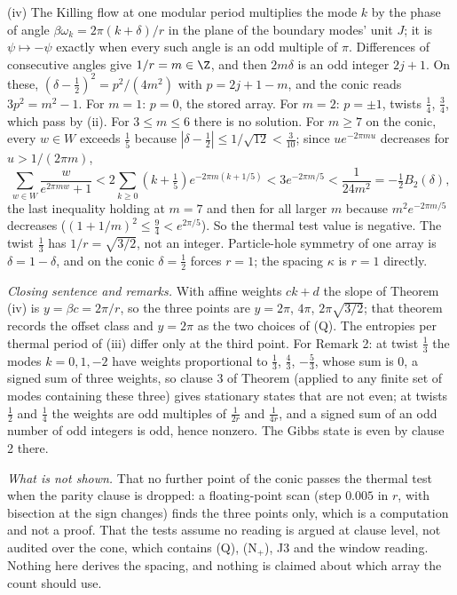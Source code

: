 (iv) The Killing flow at one modular period multiplies the mode $k$ by the phase of angle $\beta\omega_{k} = 2\pi(k + \delta)/r$ in the plane of the boundary modes' unit $J$; it is $\psi \mapsto -\psi$ exactly when every such angle is an odd multiple of $\pi$. Differences of consecutive angles give $1/r = m \in \Z$, and then $2m\delta$ is an odd integer $2j + 1$. On these, $(\delta - \tfrac12)^{2} = p^{2}/(4m^{2})$ with $p = 2j + 1 - m$, and the conic reads $3p^{2} = m^{2} - 1$. For $m = 1$: $p = 0$, the stored array. For $m = 2$: $p = \pm 1$, twists $\tfrac14$, $\tfrac34$, which pass by (ii). For $3 \le m \le 6$ there is no solution. For $m \ge 7$ on the conic, every $w \in W$ exceeds $\tfrac15$ because $|\delta - \tfrac12| \le 1/\sqrt{12} < \tfrac{3}{10}$; since $ue^{-2\pi mu}$ decreases for $u > 1/(2\pi m)$,
\[
\sum_{w \in W}\frac{w}{e^{2\pi mw} + 1} < 2\sum_{k \ge 0}(k + \tfrac15)e^{-2\pi m(k + 1/5)} < 3e^{-2\pi m/5} < \frac{1}{24m^{2}} = -\tfrac12 B_{2}(\delta),
\]
the last inequality holding at $m = 7$ and then for all larger $m$ because $m^{2}e^{-2\pi m/5}$ decreases ($(1 + 1/m)^{2} \le \tfrac94 < e^{2\pi/5}$). So the thermal test value is negative. The twist $\tfrac13$ has $1/r = \sqrt{3/2}$, not an integer. Particle-hole symmetry of one array is $\delta = 1 - \delta$, and on the conic $\delta = \tfrac12$ forces $r = 1$; the spacing $\kappa$ is $r = 1$ directly.

\emph{Closing sentence and remarks.} With affine weights $ck + d$ the slope of Theorem (iv) is $y = \beta c = 2\pi/r$, so the three points are $y = 2\pi$, $4\pi$, $2\pi\sqrt{3/2}$; that theorem records the offset class and $y = 2\pi$ as the two choices of (Q). The entropies per thermal period of (iii) differ only at the third point. For Remark 2: at twist $\tfrac13$ the modes $k = 0, 1, -2$ have weights proportional to $\tfrac13$, $\tfrac43$, $-\tfrac53$, whose sum is $0$, a signed sum of three weights, so clause 3 of Theorem  (applied to any finite set of modes containing these three) gives stationary states that are not even; at twists $\tfrac12$ and $\tfrac14$ the weights are odd multiples of $\tfrac{1}{2r}$ and $\tfrac{1}{4r}$, and a signed sum of an odd number of odd integers is odd, hence nonzero. The Gibbs state is even by clause 2 there.

\emph{What is not shown.} That no further point of the conic passes the thermal test when the parity clause is dropped: a floating-point scan (step $0.005$ in $r$, with bisection at the sign changes) finds the three points only, which is a computation and not a proof. That the tests assume no reading is argued at clause level, not audited over the cone, which contains (Q), (N$_{+}$), J3 and the window reading. Nothing here derives the spacing, and nothing is claimed about which array the count should use.
